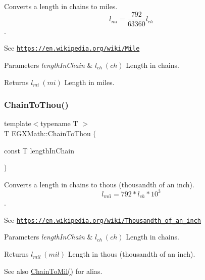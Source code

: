 Converts a length in chains to miles. \[ l_{mi}=\frac{792}{63360} l_{ch} \]. 

See \href{https://en.wikipedia.org/wiki/Mile}{\tt https\+://en.\+wikipedia.\+org/wiki/\+Mile} 
\begin{DoxyParams}{Parameters}
{\em length\+In\+Chain} & $ l_{ch}\ (ch)$ Length in chains. \\
\hline
\end{DoxyParams}
\begin{DoxyReturn}{Returns}
$ l_{mi}\ (mi)$ Length in miles. 
\end{DoxyReturn}
\mbox{\label{group___e_g_x_math-_conversions-_length_conversions-_imperial-_chain-_imperial_ga64cd46f80e3af5d7ca664456080ef6a3}} 
\subsubsection{\texorpdfstring{Chain\+To\+Thou()}{ChainToThou()}}
{\footnotesize\ttfamily template$<$typename T $>$ \\
T E\+G\+X\+Math\+::\+Chain\+To\+Thou (\begin{DoxyParamCaption}\item[{const T}]{length\+In\+Chain }\end{DoxyParamCaption})}



Converts a length in chains to thous (thousandth of an inch). \[ l_{mil}= 792 * l_{ch} * 10^{3} \]. 

See \href{https://en.wikipedia.org/wiki/Thousandth_of_an_inch}{\tt https\+://en.\+wikipedia.\+org/wiki/\+Thousandth\+\_\+of\+\_\+an\+\_\+inch} 
\begin{DoxyParams}{Parameters}
{\em length\+In\+Chain} & $ l_{ch}\ (ch)$ Length in chains. \\
\hline
\end{DoxyParams}
\begin{DoxyReturn}{Returns}
$ l_{mil}\ (mil)$ Length in thous (thousandth of an inch). 
\end{DoxyReturn}
\begin{DoxySeeAlso}{See also}
\mbox{\hyperlink{group___e_g_x_math-_conversions-_length_conversions-_imperial-_chain-_imperial_gae1276611dce26e23deae1b0379b4394d}{Chain\+To\+Mil()}} for alias. 
\end{DoxySeeAlso}
\mbox{\label{group___e_g_x_math-_conversions-_length_conversions-_imperial-_chain-_imperial_ga9d6b8e5d2dfaf555b923e8ba2d324ae4}} 
